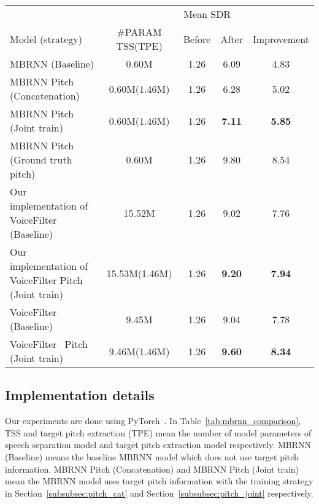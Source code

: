 \begin{table*}[!htbp]
    \centering
    \begin{tabular}{l|c|c|c|c}
        \toprule
        & \multicolumn{4}{c}{Mean SDR} \\
        Model (strategy)                             & \#PARAM TSS(TPE) & Before & After         & Improvement   \\
        \midrule
        MBRNN (Baseline)                             & 0.60M            & 1.26   & 6.09          & 4.83          \\
        MBRNN Pitch (Concatenation)                  & 0.60M(1.46M)     & 1.26   & 6.28          & 5.02          \\
        MBRNN Pitch (Joint train)                    & 0.60M(1.46M)     & 1.26   & \textbf{7.11} & \textbf{5.85} \\
        MBRNN Pitch (Ground truth pitch)             & 0.60M            & 1.26   & 9.80          & 8.54          \\
        \midrule
        Our implementation of VoiceFilter (Baseline) & 15.52M           & 1.26   & 9.02          & 7.76          \\
        Our implementation of VoiceFilter Pitch (Joint train) & 15.53M(1.46M) & 1.26 & \textbf{9.20}
        & \textbf{7.94}
        \\
        \midrule
        VoiceFilter~\cite{voicefilter} (Baseline)    & 9.45M            & 1.26   & 9.04          & 7.78          \\
        VoiceFilter~\cite{voicefilter} Pitch (Joint train) & 9.46M(1.46M) & 1.26 & \textbf{9.60}
        & \textbf{8.34}
        \\
        \bottomrule
    \end{tabular}
    \caption{Results comparison between different training strategies and the baseline with MBRNN and VoiceFilter model. ``Before" means the SDR value of the mixed utterance, ``After" means the SDR value of the estimated speech.}
    \label{tab:mbrnn_comparison}
\end{table*}

\subsection{Implementation details}
\label{subsec:implement}

Our experiments are done using PyTorch~\cite{NEURIPS2019_bdbca288}.
In Table~\ref{tab:mbrnn_comparison}, TSS and target pitch extraction (TPE) mean the number of model parameters of speech separation model and target pitch extraction model respectively.
MBRNN (Baseline) means the baseline MBRNN model which does not use target pitch information. MBRNN Pitch (Concatenation) and MBRNN Pitch (Joint train) mean the MBRNN model uses target pitch information with the training strategy in Section~\ref{subsubsec:pitch_cat} and Section~\ref{subsubsec:pitch_joint} respectively.


